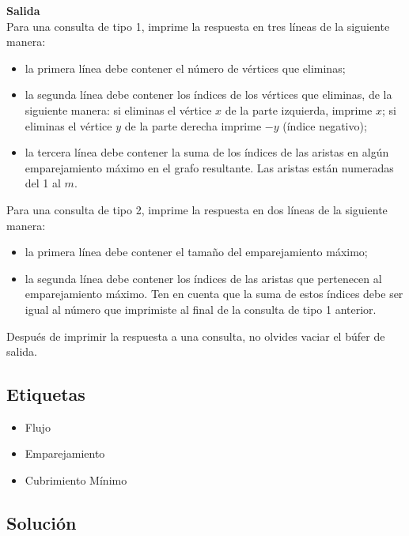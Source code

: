 \documentclass{article}
\begin{document}
\textbf{Salida}\\

Para una consulta de tipo 1, imprime la respuesta en tres líneas de la siguiente manera:

\begin{itemize}
    \item la primera línea debe contener el número de vértices que eliminas;
    \item la segunda línea debe contener los índices de los vértices que eliminas, de la siguiente manera: si eliminas el vértice $x$ de la parte izquierda, imprime $x$; si eliminas el vértice $y$ de la parte derecha imprime $-y$ (índice negativo);
    \item la tercera línea debe contener la suma de los índices de las aristas en algún emparejamiento máximo en el grafo resultante. Las aristas están numeradas del 1 al $m$.
\end{itemize}

Para una consulta de tipo 2, imprime la respuesta en dos líneas de la siguiente manera:

\begin{itemize}
    \item la primera línea debe contener el tamaño del emparejamiento máximo;
    \item la segunda línea debe contener los índices de las aristas que pertenecen al emparejamiento máximo. Ten en cuenta que la suma de estos índices debe ser igual al número que imprimiste al final de la consulta de tipo 1 anterior.
\end{itemize}

Después de imprimir la respuesta a una consulta, no olvides vaciar el búfer de salida.

\subsection{Etiquetas}

\begin{itemize}
    \item Flujo
    \item Emparejamiento
    \item Cubrimiento Mínimo
\end{itemize}

\subsection{Solución}
\end{document}
